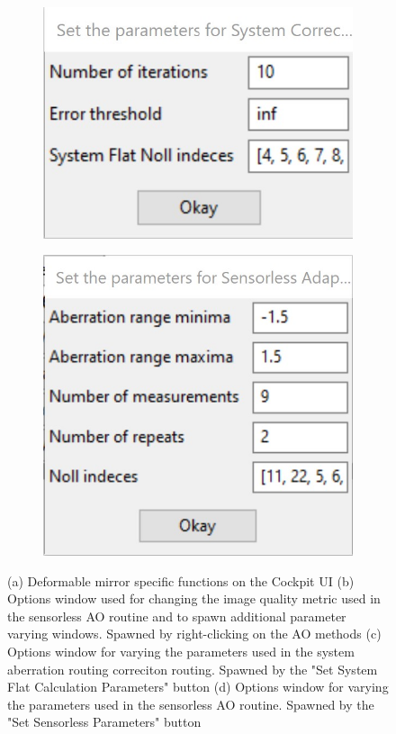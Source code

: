 \begin{figure}[H]
	\begin{subfigure}{0.45\textwidth}
		\centering
		\includegraphics[width=\linewidth]{images/direct_wavefront_sensing_options.jpg}
		\caption{}
		\label{fig:DM_direct_wavefront_sensing_options}
	\end{subfigure}
	\begin{subfigure}{0.35\textwidth}
		\centering
		\includegraphics[width=\linewidth]{images/sensorless_ao_parameters.jpg}
		\caption{}
		\label{fig:DM_sensorless_ao_parameters}
	\end{subfigure}
	\caption{(a) Deformable mirror specific functions on the Cockpit UI (b) Options window used for changing the image quality metric used in the sensorless AO routine and to spawn additional parameter varying windows. Spawned by right-clicking on the AO methods (c) Options window for varying the parameters used in the system aberration routing correciton routing. Spawned by the "Set System Flat Calculation Parameters" button (d) Options window for varying the parameters used in the sensorless AO routine. Spawned by the "Set Sensorless Parameters" button}
	\label{fig:DM_methods}
\end{figure}

